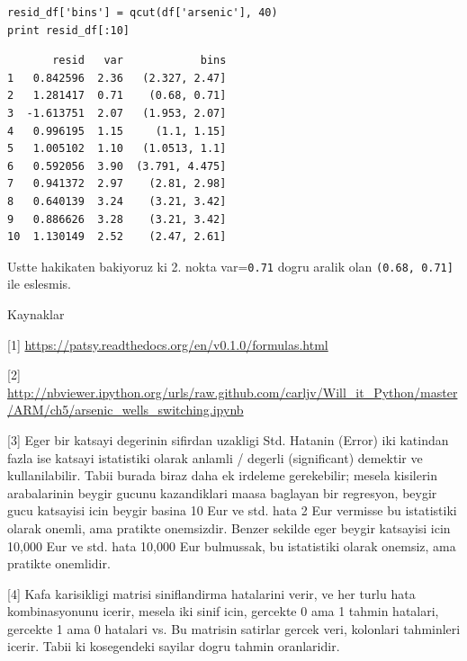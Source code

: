\documentclass[12pt,fleqn]{article}\usepackage{../common}
\begin{document}
\begin{verbatim}
resid_df['bins'] = qcut(df['arsenic'], 40)
print resid_df[:10]
\end{verbatim}

\begin{verbatim}
       resid   var            bins
1   0.842596  2.36   (2.327, 2.47]
2   1.281417  0.71    (0.68, 0.71]
3  -1.613751  2.07   (1.953, 2.07]
4   0.996195  1.15     (1.1, 1.15]
5   1.005102  1.10   (1.0513, 1.1]
6   0.592056  3.90  (3.791, 4.475]
7   0.941372  2.97    (2.81, 2.98]
8   0.640139  3.24    (3.21, 3.42]
9   0.886626  3.28    (3.21, 3.42]
10  1.130149  2.52    (2.47, 2.61]
\end{verbatim}

Ustte hakikaten bakiyoruz ki 2. nokta var=\verb!0.71! dogru
aralik olan \verb!(0.68, 0.71]! ile eslesmis.

Kaynaklar

[1] \url{https://patsy.readthedocs.org/en/v0.1.0/formulas.html}

[2] \url{http://nbviewer.ipython.org/urls/raw.github.com/carljv/Will_it_Python/master/ARM/ch5/arsenic_wells_switching.ipynb}

[3] Eger bir katsayi degerinin sifirdan uzakligi Std. Hatanin (Error) iki
katindan fazla ise katsayi istatistiki olarak anlamli / degerli
(significant) demektir ve kullanilabilir. Tabii burada biraz daha ek
irdeleme gerekebilir; mesela kisilerin arabalarinin beygir gucunu
kazandiklari maasa baglayan bir regresyon, beygir gucu katsayisi icin
beygir basina 10 Eur ve std. hata 2 Eur vermisse bu istatistiki olarak
onemli, ama pratikte onemsizdir. Benzer sekilde eger beygir katsayisi icin
10,000 Eur ve std. hata 10,000 Eur bulmussak, bu istatistiki olarak
onemsiz, ama pratikte onemlidir.

[4] Kafa karisikligi matrisi siniflandirma hatalarini verir, ve her turlu
hata kombinasyonunu icerir, mesela iki sinif icin, gercekte 0 ama 1 tahmin
hatalari, gercekte 1 ama 0 hatalari vs. Bu matrisin satirlar gercek veri,
kolonlari tahminleri icerir. Tabii ki kosegendeki sayilar dogru tahmin
oranlaridir.
\end{document}
